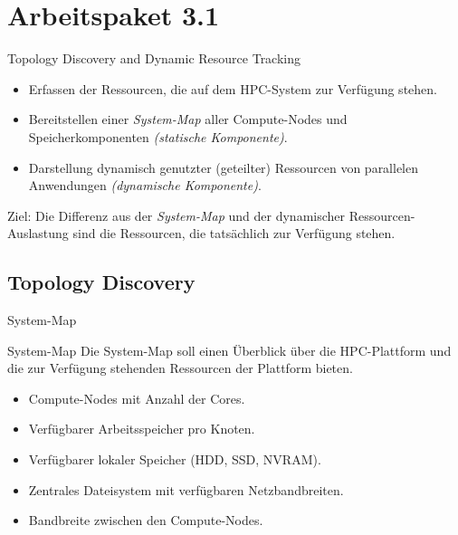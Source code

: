\section{Arbeitspaket 3.1}

\begin{frame}{Topology Discovery and Dynamic Resource Tracking}
    \begin{itemize}
        \item Erfassen der Ressourcen, die auf dem HPC-System zur Verf\"{u}gung
            stehen.
        \item Bereitstellen einer \emph{System-Map} aller Compute-Nodes und
            Speicherkomponenten \emph{(statische Komponente)}.
        \item Darstellung dynamisch genutzter (geteilter) Ressourcen von parallelen
            Anwendungen \emph{(dynamische Komponente)}.
    \end{itemize}
    \begin{block}{Ziel:}
        Die Differenz aus der \emph{System-Map} und der dynamischer Ressourcen-Auslastung
        sind die Ressourcen, die tats\"{a}chlich zur Verf\"{u}gung stehen.
    \end{block}
\end{frame}

\subsection{Topology Discovery}

\begin{frame}{System-Map}
    \begin{block}{System-Map}
        Die System-Map soll einen \"{U}berblick \"{u}ber die HPC-Plattform
        und die zur Verf\"{u}gung stehenden Ressourcen der Plattform bieten.
    \end{block}
    \begin{itemize}
        \item Compute-Nodes mit Anzahl der Cores.
        \item Verf\"{u}gbarer Arbeitsspeicher pro Knoten.
        \item Verf\"{u}gbarer lokaler Speicher (HDD, SSD, NVRAM).
        \item Zentrales Dateisystem mit verf\"{u}gbaren Netzbandbreiten.
        \item Bandbreite zwischen den Compute-Nodes.
    \end{itemize}
\end{frame}

